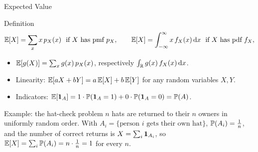 \begin{frame}{Expected Value}
  \small
  \begin{block}{Definition}
    \[
      \mathbb{E}[X]=\sum_x x\,p_X(x)\ \text{ if $X$ has pmf $p_X$},
      \qquad
      \mathbb{E}[X]=\int_{-\infty}^{\infty} x\,f_X(x)\,\mathrm{d} x\ \text{ if $X$ has pdf $f_X$},
    \]
  \end{block}
  \begin{itemize}
    \item $\mathbb{E}[g(X)]=\sum_x g(x)\,p_X(x)$, respectively $\int_{\mathbb{R}} g(x)\,f_X(x)\,\mathrm{d} x$.
    \item Linearity: $\mathbb{E}[aX+bY]=a\,\mathbb{E}[X]+b\,\mathbb{E}[Y]$ for any random variables $X,Y$.
    \item Indicators: $\mathbb{E}[\mathbf{1}_A]=1\cdot\mathbb{P}(\mathbf{1}_A=1)+0\cdot\mathbb{P}(\mathbf{1}_A=0)=\mathbb{P}(A)$.
  \end{itemize}
  \begin{block}{Example: the hat-check problem}
    $n$ hats are returned to their $n$ owners in uniformly random order. With $A_i=\{\text{person $i$ gets their own hat}\}$, $\mathbb{P}(A_i)=\tfrac1n$, and the number of
    correct returns is $X=\sum_{i}\mathbf{1}_{A_i}$, so $\mathbb{E}[X]=\sum_{i}\mathbb{P}(A_i)=n\cdot\tfrac1n=1$ for every $n$.
  \end{block}
\end{frame}

